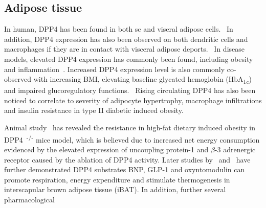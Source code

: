 \subsection{Adipose tissue}
In human, DPP4 has been found in both sc and viseral adipose cells.~\cite{Lamers2011} In addition, DPP4 expression has also been observed on both dendritic cells and macrophages if they are in contact with visceral adipose deports.~\cite{Zhong2013} In disease models, elevated DPP4 expression has commonly been found, including obesity and inflammation~\cite{Zhong2013}. Increased DPP4 expression level is also commonly co-observed with increasing BMI, elevating baseline glycated hemoglobin (HbA\textsubscript{1c})~\cite{2011} and impaired glucoregulatory functions.~\cite{Zhong2013,Sell2013} Rising circulating DPP4 has also been noticed to correlate to severity of adipocyte hypertrophy, macrophage infiltrations and insulin resistance in type II diabetic induced obesity.~\cite{Sell2013}  
\par 
Animal study~\cite{Conarello2003} has revealed the resistance in high-fat dietary induced obesity in DPP4~\textsuperscript{-/-} mice model, which is believed due to increased net energy consumption evidenced by the elevated expression of uncoupling protein-1 and $\beta$-3 adrenergic receptor caused by the ablation of DPP4 activity. Later studies by~\citet{Bordicchia2012} and~\citet{Lockie2012} have further demonstrated DPP4 substrates BNP, GLP-1 and oxyntomodulin can promote respiration, energy expenditure and stimulate thermogenesis in interscapular brown adipose tissue (iBAT). In addition, further several pharmacological